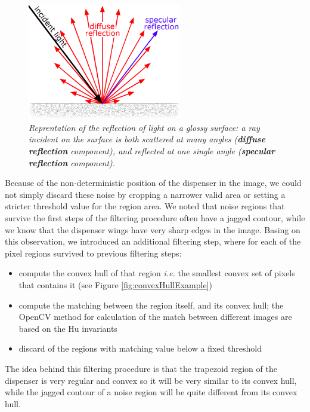 \begin{description}
\begin{figure}
	\centering
	\includegraphics[width=0.6\textwidth]{Images/arm/specularReflection.png}
	\caption{\textit{Reprentation of the reflection of light on a glossy surface: a ray incident on the surface is both scattered at many angles (\textbf{diffuse reflection} component), and reflected at one single angle (\textbf{specular reflection} component).}}
	\label{fig:specularComponent}
\end{figure}


Because of the non-deterministic position of the dispenser in the image, we could not simply discard these noise by cropping a narrower valid area or setting a stricter threshold value for the region area. We noted that noise regions that survive the first steps of the filtering procedure often have a jagged contour, while we know that the dispenser wings have very sharp edges in the image. Basing on this observation, we introduced an additional filtering step, where for each of the pixel regions survived to previous filtering steps:
\begin{itemize}
	\item compute the convex hull of that region \textit{i.e.} the smallest convex set of pixels that contains it (see Figure \ref{fig:convexHullExample})
	\item compute the matching between the region itself, and its convex hull; the OpenCV method for calculation of the match between different images are based on the Hu invariants \parencite{huInvariants}
	\item discard of the regions with matching value below a fixed threshold
\end{itemize}
The idea behind this filtering procedure is that the trapezoid region of the dispenser is very regular and convex so it will be very similar to its convex hull, while the jagged contour of a noise region will be quite different from its convex hull. \\


\end{description}
